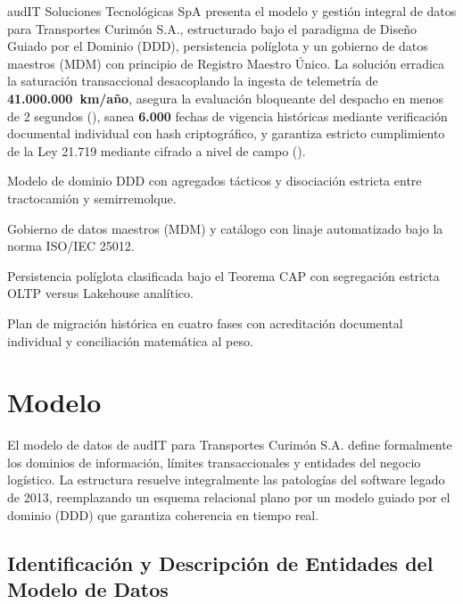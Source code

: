 
\begin{resumenApertura}
audIT Soluciones Tecnológicas SpA presenta el modelo y gestión integral de datos para Transportes Curimón S.A., estructurado bajo el paradigma de Diseño Guiado por el Dominio (DDD), persistencia políglota y un gobierno de datos maestros (MDM) con principio de Registro Maestro Único. La solución erradica la saturación transaccional desacoplando la ingesta de telemetría de \textbf{41.000.000~km/año}, asegura la evaluación bloqueante del despacho en menos de 2 segundos (), sanea \textbf{6.000} fechas de vigencia históricas mediante verificación documental individual con hash criptográfico, y garantiza estricto cumplimiento de la Ley 21.719 mediante cifrado a nivel de campo ().
\begin{recibe}
  \item Modelo de dominio DDD con agregados tácticos y disociación estricta entre tractocamión y semirremolque.
  \item Gobierno de datos maestros (MDM) y catálogo con linaje automatizado bajo la norma ISO/IEC 25012.
  \item Persistencia políglota clasificada bajo el Teorema CAP con segregación estricta OLTP versus Lakehouse analítico.
  \item Plan de migración histórica en cuatro fases con acreditación documental individual y conciliación matemática al peso.
\end{recibe}
\end{resumenApertura}

\section{Modelo}\label{sec:5-modelo}

El modelo de datos de audIT para Transportes Curimón S.A. define formalmente los dominios de información, límites transaccionales y entidades del negocio logístico. La estructura resuelve integralmente las patologías del software legado de 2013, reemplazando un esquema relacional plano por un modelo guiado por el dominio (DDD) que garantiza coherencia en tiempo real.

\subsection{Identificación y Descripción de Entidades del Modelo de Datos}\label{sec:5-entidades}

